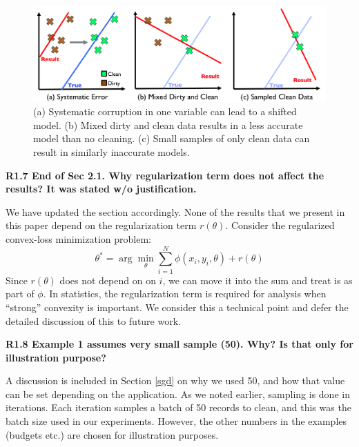 \begin{figure}[ht!]
\centering
 \includegraphics[width=\columnwidth]{figs/update-arch.png}
 \caption{(a) Systematic corruption in one variable can lead to a shifted model. 
 (b) Mixed dirty and clean data results in a less accurate model than no cleaning.
(c) Small samples of only clean data can result in similarly inaccurate models. \label{update-arch-coverletter}}
\end{figure}

\vspace{0.5em}

\noindent\textbf{R1.7 End of Sec 2.1. Why regularization term does not affect the results? It was stated w/o justification.}

\noindent  We have updated the section accordingly.
None of the results that we present in this paper depend on the regularization term $r(\theta)$.
Consider the regularized convex-loss minimization problem:
\[
 \theta^{*}=\arg\min_{\theta}\sum_{i=1}^{N}\phi(x_{i},y_{i},\theta) + r(\theta)
\]
Since $r(\theta)$ does not depend on on $i$, we can move it into the sum and treat is as part of $\phi$.
In statistics, the regularization term is required for analysis when ``strong'' convexity is important.
We consider this a technical point and defer the detailed discussion of this to future work.

\vspace{0.5em}

\noindent\textbf{R1.8 Example 1 assumes very small sample (50). Why? Is that only for illustration purpose?}

\noindent  A discussion is included in Section \ref{sgd} on why we used 50, and how that value can be set depending on the application. As we noted earlier, sampling is done in iterations. Each iteration samples a batch of 50 records to clean, and this was the batch size used in our experiments. However, the other numbers in the examples (budgets etc.) are chosen for illustration purposes. 

\vspace{0.5em}

